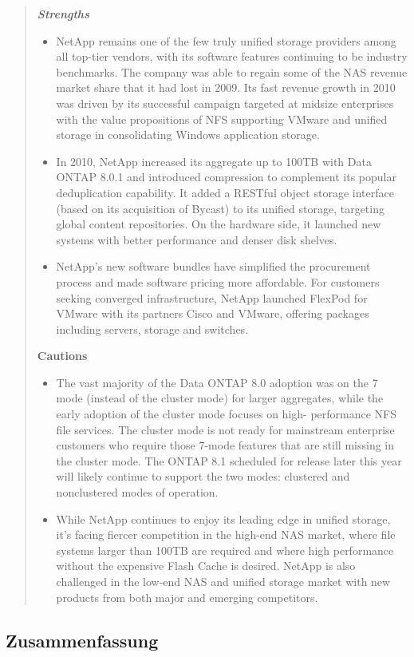 \begin{quotation}
\em 
\textbf{Strengths}
\begin{itemize}
\item NetApp remains one of the few truly unified storage providers among all top-tier vendors, with its software features continuing to be industry benchmarks. The company was able to regain some of the NAS revenue market share that it had lost in 2009. Its fast revenue growth in 2010 was driven by its successful campaign targeted at midsize enterprises with the value propositions of NFS supporting VMware and unified storage in consolidating Windows application storage.

\item In 2010, NetApp increased its aggregate up to 100TB with Data ONTAP 8.0.1 and introduced compression to complement its popular deduplication capability. It added a RESTful object storage interface (based on its acquisition of Bycast) to its unified storage, targeting global content repositories. On the hardware side, it launched new systems with better performance and denser disk shelves.

\item NetApp's new software bundles have simplified the procurement process and made software pricing more affordable. For customers seeking converged infrastructure, NetApp launched FlexPod for VMware with its partners Cisco and VMware, offering packages including servers, storage and switches.
\end{itemize}
\textbf{Cautions} 
\begin{itemize}
\item The vast majority of the Data ONTAP 8.0 adoption was on the 7 mode (instead of the cluster mode) for larger aggregates, while the early adoption of the cluster mode focuses on high- performance NFS file services. The cluster mode is not ready for mainstream enterprise customers who require those 7-mode features that are still missing in the cluster mode. The ONTAP 8.1 scheduled for release later this year will likely continue to support the two modes: clustered and nonclustered modes of operation.
\item While NetApp continues to enjoy its leading edge in unified storage, it's facing fiercer competition in the high-end NAS market, where file systems larger than 100TB are required and where high performance without the expensive Flash Cache is desired.
NetApp is also challenged in the low-end NAS and unified storage market with new products from both major and emerging competitors.
\end{itemize}
\end{quotation}\cite{IEEE2003}



\subsection{Zusammenfassung}



